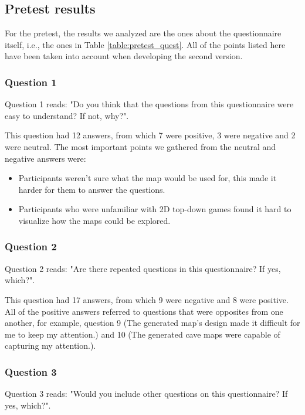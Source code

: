 \subsection{Pretest results}

For the pretest, the results we analyzed are the ones about the questionnaire itself, i.e., the ones in Table \ref{table:pretest_quest}. All of the points listed here have been taken into account when developing the second version.

\subsubsection{Question 1}

Question 1 reads: "Do you think that the questions from this questionnaire were easy to understand? If not, why?".

This question had 12 answers, from which 7 were positive, 3 were negative and 2 were neutral. The most important points we gathered from the neutral and negative answers were:

\begin{itemize}
    \item Participants weren't sure what the map would be used for, this made it harder for them to answer the questions.
    \item Participants who were unfamiliar with 2D top-down games found it hard to visualize how the maps could be explored.
\end{itemize}

\subsubsection{Question 2}

Question 2 reads: "Are there repeated questions in this questionnaire? If yes, which?".

This question had 17 answers, from which 9 were negative and 8 were positive. All of the positive answers referred to questions that were opposites from one another, for example, question 9 (The generated map’s design made it difficult for me to keep my attention.) and 10 (The generated cave maps were capable of capturing my attention.).

\subsubsection{Question 3}

Question 3 reads: "Would you include other questions on this questionnaire? If yes, which?".

